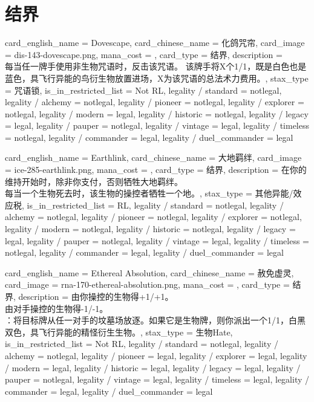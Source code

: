 \documentclass[lang = cn, color = black, 10pt]{AllThatStax}
\begin{document}
\section{结界}

\card
{
	card_english_name = {Dovescape},
	card_chinese_name = {化鸽咒帘},
	card_image = dis-143-dovescape.png,
	mana_cost = ,
	card_type = 结界,
	description = {\\
每当任一牌手使用非生物咒语时，反击该咒语。 该牌手将X个1/1，既是白色也是蓝色，具飞行异能的鸟衍生物放置进场，X为该咒语的总法术力费用。},
	stax_type = 咒语锁,
	is_in_restricted_list = Not RL,
	legality / standard = notlegal,
	legality / alchemy = notlegal,
	legality / pioneer = notlegal,
	legality / explorer = notlegal,
	legality / modern = legal,
	legality / historic = notlegal,
	legality / legacy = legal,
	legality / pauper = notlegal,
	legality / vintage = legal,
	legality / timeless = notlegal,
	legality / commander = legal,
	legality / duel_commander = legal
}

\card
{
	card_english_name = {Earthlink},
	card_chinese_name = {大地羁绊},
	card_image = ice-285-earthlink.png,
	mana_cost = ,
	card_type = 结界,
	description = {在你的维持开始时，除非你支付，否则牺牲大地羁绊。\\
每当一个生物死去时，该生物的操控者牺牲一个地。},
	stax_type = 其他异能/效应税,
	is_in_restricted_list = RL,
	legality / standard = notlegal,
	legality / alchemy = notlegal,
	legality / pioneer = notlegal,
	legality / explorer = notlegal,
	legality / modern = notlegal,
	legality / historic = notlegal,
	legality / legacy = legal,
	legality / pauper = notlegal,
	legality / vintage = legal,
	legality / timeless = notlegal,
	legality / commander = legal,
	legality / duel_commander = legal
}

\card
{
	card_english_name = {Ethereal Absolution},
	card_chinese_name = {赦免虚灵},
	card_image = rna-170-ethereal-absolution.png,
	mana_cost = ,
	card_type = 结界,
	description = {由你操控的生物得+1/+1。\\
由对手操控的生物得-1/-1。\\
：将目标牌从任一对手的坟墓场放逐。如果它是生物牌，则你派出一个1/1，白黑双色，具飞行异能的精怪衍生生物。},
	stax_type = 生物Hate,
	is_in_restricted_list = Not RL,
	legality / standard = notlegal,
	legality / alchemy = notlegal,
	legality / pioneer = legal,
	legality / explorer = legal,
	legality / modern = legal,
	legality / historic = legal,
	legality / legacy = legal,
	legality / pauper = notlegal,
	legality / vintage = legal,
	legality / timeless = legal,
	legality / commander = legal,
	legality / duel_commander = legal
}
\end{document}
